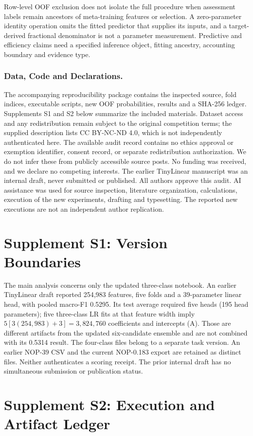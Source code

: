 \documentclass[doublecolumn]{ijcvsplatex}
\begin{document}
Row-level OOF exclusion does not isolate the full procedure when assessment labels remain ancestors of meta-training features or selection. A zero-parameter identity operation omits the fitted predictor that supplies its inputs, and a target-derived fractional denominator is not a parameter measurement. Predictive and efficiency claims need a specified inference object, fitting ancestry, accounting boundary and evidence type.

\subsubsection*{Data, Code and Declarations.}
The accompanying reproducibility package contains the inspected source, fold indices, executable scripts, new OOF probabilities, results and a SHA-256 ledger. Supplements S1 and S2 below summarize the included materials. Dataset access and any redistribution remain subject to the original competition terms; the supplied description lists CC BY-NC-ND 4.0, which is not independently authenticated here. The available audit record contains no ethics approval or exemption identifier, consent record, or separate redistribution authorization. We do not infer these from publicly accessible source posts. No funding was received, and we declare no competing interests. The earlier TinyLinear manuscript was an internal draft, never submitted or published. All authors approve this audit. AI assistance was used for source inspection, literature organization, calculations, execution of the new experiments, drafting and typesetting. The reported new executions are not an independent author replication.

\appendix
\section{Supplement S1: Version Boundaries}
The main analysis concerns only the updated three-class notebook. An earlier TinyLinear draft reported 254,983 features, five folds and a 39-parameter linear head, with pooled macro-F1 0.5295. Its test average required five heads (195 head parameters); five three-class LR fits at that feature width imply $5[3(254{,}983)+3]=3{,}824{,}760$ coefficients and intercepts (A). Those are different artifacts from the updated six-candidate ensemble and are not combined with its 0.5314 result. The four-class files belong to a separate task version. An earlier NOP-39 CSV and the current NOP-0.183 export are retained as distinct files. Neither authenticates a scoring receipt. The prior internal draft has no simultaneous submission or publication status.

\section{Supplement S2: Execution and Artifact Ledger}




\end{document}
